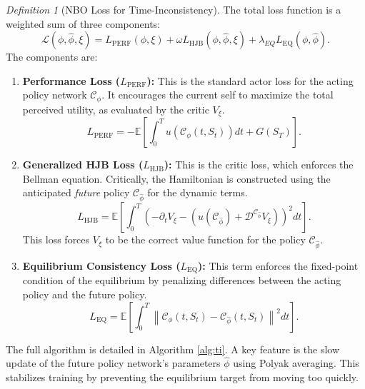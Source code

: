 \documentclass[ecta,draft]{econsocart}
\theoremstyle{plain}
\theoremstyle{remark}
\newtheorem{definition}{Definition}
\newcommand{\E}{\mathbb{E}}
\newcommand{\diffop}{\mathcal{D}}
\begin{document}
\begin{definition}[NBO Loss for Time-Inconsistency]
The total loss function is a weighted sum of three components:
\begin{equation}
\mathcal{L}(\phi, \hat{\phi}, \xi) = L_{\text{PERF}}(\phi, \xi) + \omega L_{\text{HJB}}(\phi, \hat{\phi}, \xi) + \lambda_{EQ} L_{\text{EQ}}(\phi, \hat{\phi}).
\end{equation}
The components are:
\begin{enumerate}
    \item \textbf{Performance Loss ($L_{\text{PERF}}$):} This is the standard actor loss for the acting policy network $\mathcal{C}_\phi$. It encourages the current self to maximize the total perceived utility, as evaluated by the critic $V_\xi$.
    \begin{equation}
    L_{\text{PERF}} = - \E \left[ \int_0^T u(\mathcal{C}_{\phi}(t,S_t)) dt + G(S_T) \right].
    \end{equation}
    
    \item \textbf{Generalized HJB Loss ($L_{\text{HJB}}$):} This is the critic loss, which enforces the Bellman equation. Critically, the Hamiltonian is constructed using the anticipated \textit{future} policy $\mathcal{C}_{\hat{\phi}}$ for the dynamic terms.
    \begin{equation}
    L_{\text{HJB}} = \E \left[ \int_0^T \left( -\partial_t V_\xi - \left( u(\mathcal{C}_{\hat{\phi}}) + \diffop^{\mathcal{C}_{\hat{\phi}}}V_\xi \right) \right)^2 dt \right].
    \end{equation}
    This loss forces $V_\xi$ to be the correct value function for the policy $\mathcal{C}_{\hat{\phi}}$.
    
    \item \textbf{Equilibrium Consistency Loss ($L_{\text{EQ}}$):} This term enforces the fixed-point condition of the equilibrium by penalizing differences between the acting policy and the future policy.
    \begin{equation}
    L_{\text{EQ}} = \E \left[ \int_0^T \left\| \mathcal{C}_{\phi}(t,S_t) - \mathcal{C}_{\hat{\phi}}(t,S_t) \right\|^2 dt \right].
    \end{equation}
\end{enumerate}
\end{definition}

The full algorithm is detailed in Algorithm \ref{alg:ti}. A key feature is the slow update of the future policy network's parameters $\hat{\phi}$ using Polyak averaging. This stabilizes training by preventing the equilibrium target from moving too quickly.
\end{document}
